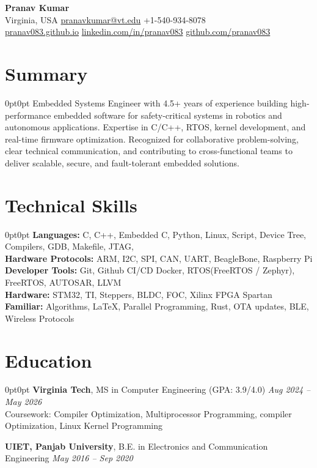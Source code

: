 \documentclass[10pt, letterpaper]{article}
\newenvironment{onecolentry}{\begin{adjustwidth}{0pt}{0pt}}{\end{adjustwidth}}
\begin{document}
\begin{center}
    {\LARGE \textbf{Pranav Kumar}}\\[4pt]
    Virginia, USA \quad \textbar \quad
    \href{mailto:pranavkumar@vt.edu}{pranavkumar@vt.edu} \quad \textbar \quad
    +1-540-934-8078\\
    \href{https://pranav083.github.io}{pranav083.github.io} \quad \textbar \quad
    \href{https://linkedin.com/in/pranav083}{linkedin.com/in/pranav083} \quad \textbar \quad
    \href{https://github.com/pranav083}{github.com/pranav083}
\end{center}

\section{Summary}
\begin{onecolentry}
    Embedded Systems Engineer with 4.5+ years of experience building high-performance embedded software 
    for safety-critical systems in robotics and autonomous applications. Expertise in C/C++, RTOS, kernel development, 
    and real-time firmware optimization. Recognized for collaborative problem-solving, clear technical communication, 
    and contributing to cross-functional teams to deliver scalable, secure, and fault-tolerant embedded solutions.
\end{onecolentry}

\section{Technical Skills}
\begin{onecolentry}
\textbf{Languages:} C, C++, Embedded C, Python, Linux, Script, Device Tree, Compilers, GDB, Makefile, JTAG,\\
\textbf{Hardware Protocols:} ARM, I2C, SPI, CAN, UART, BeagleBone, Raspberry Pi\\
\textbf{Developer Tools:} Git, Github CI/CD Docker,  RTOS(FreeRTOS / Zephyr), FreeRTOS, AUTOSAR, LLVM\\
\textbf{Hardware:} STM32, TI, Steppers, BLDC, FOC, Xilinx FPGA Spartan\\
\textbf{Familiar:} Algorithms, \LaTeX, Parallel Programming, Rust, OTA updates, BLE, Wireless Protocols\\
\end{onecolentry}

\section{Education}
\begin{onecolentry}
\textbf{Virginia Tech}, MS in Computer Engineering (GPA: 3.9/4.0) \hfill \textit{ Aug 2024 -- May 2026}\\
Coursework: Compiler Optimization, Multiprocessor Programming, compiler Optimization, Linux Kernel Programming

\vspace{6pt}
\textbf{UIET, Panjab University}, B.E. in Electronics and Communication Engineering \hfill \textit{May 2016 -- Sep 2020}
\end{onecolentry}
\end{document}

